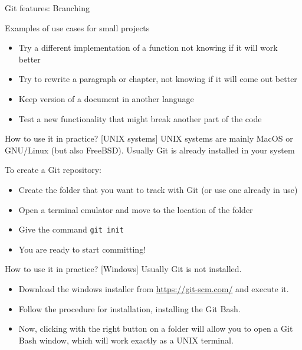 \documentclass{beamer}
\newcommand{\git}{Git{}}
\newcommand{\cd}[1]{\texttt{#1}}
\begin{document}
\begin{frame}{\git{} features: Branching}
    \begin{block}{Examples of use cases for small projects}
        \begin{itemize}
            \item Try a different implementation of a function not knowing if it will work better
            \item Try to rewrite a paragraph or chapter, not knowing if it will come out better
            \item Keep version of a document in another language
            \item Test a new functionality that might break another part of the code
        \end{itemize}
    \end{block}
\end{frame}

\begin{frame}{How to use it in practice? [UNIX systems]}
    UNIX systems are mainly MacOS or GNU/Linux (but also FreeBSD). Usually \git{} is already installed in your system
    \begin{block}{To create a \git{} repository:}
        \begin{itemize}
            \item Create the folder that you want to track with \git{} (or use one already in use)
            \item Open a terminal emulator and move to the location of the folder
            \item Give the command \cd{git init}
            \item You are ready to start committing!
        \end{itemize}
    \end{block}
\end{frame}

\begin{frame}{How to use it in practice? [Windows]}
    Usually \git{} is not installed. 
    \begin{itemize}
        \item Download the windows installer from \url{https://git-scm.com/} and execute it.
        \item Follow the procedure for installation, installing the Git Bash.
        \item Now, clicking with the right button on a folder will allow you to open a Git Bash window, which will work exactly as a UNIX terminal.
    \end{itemize}
    
\end{frame}
\end{document}
